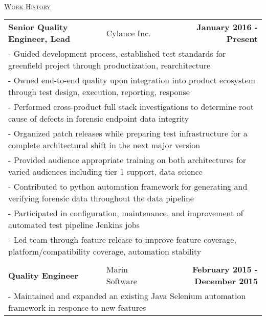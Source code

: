 \documentclass[letterpaper]{article}
\begin{document}
	\begin{center}
		\vspace{0.25in} \\
		\underline{\large \scshape Work History} \\
		\begin{tabular}{p{}p{}r}
			\\
				\textbf{Senior Quality Engineer, Lead}									&
				Cylance Inc.										&
				\textbf{January 2016 - Present}
			\\
				\multicolumn{3}{p{\textwidth}}{\quad\quad - Guided development process, established test standards for greenfield project through productization, rearchitecture} 
			\\
				\multicolumn{3}{p{\textwidth}}{\quad\quad - Owned end-to-end quality upon integration into product ecosystem through test design, execution, reporting, response} 
			\\
				\multicolumn{3}{p{\textwidth}}{\quad\quad - Performed cross-product full stack investigations to determine root cause of defects in forensic endpoint data integrity} 
			\\
				\multicolumn{3}{p{\textwidth}}{\quad\quad - Organized patch releases while preparing test infrastructure for a complete architectural shift in the next major version} 
			\\
				\multicolumn{3}{p{\textwidth}}{\quad\quad - Provided audience appropriate training on both architectures for varied audiences including tier 1 support, data science}
			\\
				\multicolumn{3}{p{\textwidth}}{\quad\quad - Contributed to python automation framework for generating and verifying forensic data throughout the data pipeline} 
			\\
				\multicolumn{3}{p{\textwidth}}{\quad\quad - Participated in configuration, maintenance, and improvement of automated test pipeline Jenkins jobs}
			\\
				\multicolumn{3}{p{\textwidth}}{\quad\quad - Led team through feature release to improve feature coverage, platform/compatibility coverage, automation stability}  
			\\
			\\
				\textbf{Quality Engineer}									&
				Marin Software										&
				\textbf{February 2015 - December 2015}
			\\
				\multicolumn{3}{p{\textwidth}}{\quad\quad - Maintained and expanded an existing Java Selenium automation framework in response to new features} 
			\\

\end{tabular}
\end{center}
\end{document}
